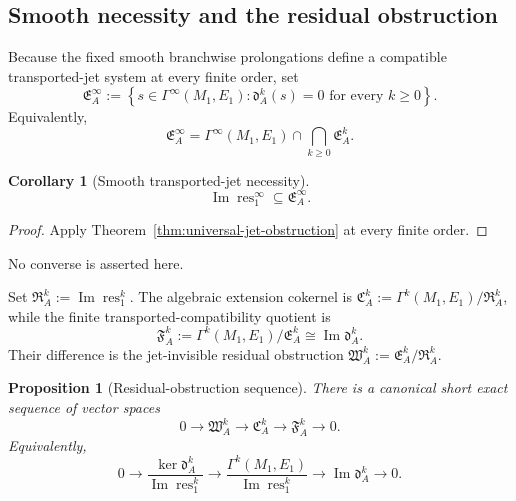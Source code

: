 \documentclass[11pt]{article}
\theoremstyle{plain}
\newtheorem{proposition}[theorem]{Proposition}
\newtheorem{corollary}[theorem]{Corollary}
\theoremstyle{definition}
\begin{document}
\subsection{Smooth necessity and the residual obstruction}
\label{subsec:formal-actual-defects}

Because the fixed smooth branchwise prolongations define a compatible
transported-jet system at every finite order, set
\[
  \mathfrak E_A^\infty
  :=
  \left\{
    s\in\Gamma^\infty(M_1,E_1):
    \mathfrak d_A^k(s)=0
    \text{ for every }k\geq0
  \right\}.
\]
Equivalently,
\[
  \mathfrak E_A^\infty
  =
  \Gamma^\infty(M_1,E_1)
  \cap
  \bigcap_{k\geq0}\mathfrak E_A^k.
\]

\begin{corollary}[Smooth transported-jet necessity]
\label{cor:smooth-universal-necessity}
\[
  \operatorname{Im}\operatorname{res}_1^\infty
  \subseteq
  \mathfrak E_A^\infty.
\]
\end{corollary}

\begin{proof}
Apply
Theorem~\ref{thm:universal-jet-obstruction}
at every finite order.
\end{proof}

No converse is asserted here.

Set
\(\mathfrak R_A^k := \operatorname{Im}\operatorname{res}_1^k\).
The algebraic extension cokernel is
\(\mathfrak C_A^k := \Gamma^k(M_1,E_1)/\mathfrak R_A^k\),
while the finite transported-compatibility quotient is
\[
  \mathfrak F_A^k
  :=
  \Gamma^k(M_1,E_1)/\mathfrak E_A^k
  \cong
  \operatorname{Im}\mathfrak d_A^k.
\]
Their difference is the jet-invisible residual obstruction
\(\mathfrak W_A^k := \mathfrak E_A^k/\mathfrak R_A^k\).

\begin{proposition}[Residual-obstruction sequence]
\label{prop:residual-obstruction-sequence}
There is a canonical short exact sequence of vector spaces
\[
  0
  \longrightarrow
  \mathfrak W_A^k
  \longrightarrow
  \mathfrak C_A^k
  \longrightarrow
  \mathfrak F_A^k
  \longrightarrow
  0.
\]
Equivalently,
\[
  0
  \longrightarrow
  \frac{
    \ker\mathfrak d_A^k
  }{
    \operatorname{Im}\operatorname{res}_1^k
  }
  \longrightarrow
  \frac{
    \Gamma^k(M_1,E_1)
  }{
    \operatorname{Im}\operatorname{res}_1^k
  }
  \longrightarrow
  \operatorname{Im}\mathfrak d_A^k
  \longrightarrow
  0.
\]
\end{proposition}
\end{document}
